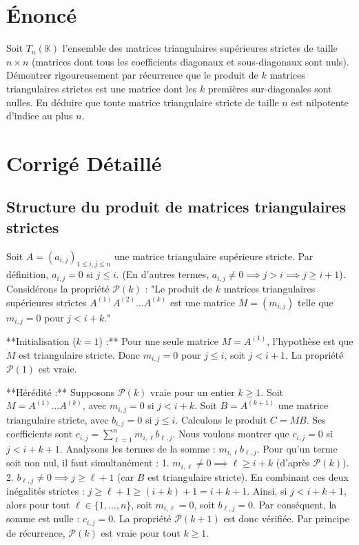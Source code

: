 \documentclass[11pt,a4paper]{article}
\begin{document}
\section{Énoncé}
Soit $T_n(\mathbb{K})$ l'ensemble des matrices triangulaires supérieures strictes de taille $n \times n$ (matrices dont tous les coefficients diagonaux et sous-diagonaux sont nuls).
Démontrer rigoureusement par récurrence que le produit de $k$ matrices triangulaires strictes est une matrice dont les $k$ premières sur-diagonales sont nulles. En déduire que toute matrice triangulaire stricte de taille $n$ est nilpotente d'indice au plus $n$.

\section{Corrigé Détaillé}

\subsection{Structure du produit de matrices triangulaires strictes}
Soit $A = (a_{i,j})_{1 \le i,j \le n}$ une matrice triangulaire supérieure stricte.
Par définition, $a_{i,j} = 0$ si $j \le i$. (En d'autres termes, $a_{i,j} \neq 0 \implies j > i \implies j \ge i+1$).
Considérons la propriété $\mathcal{P}(k)$ : "Le produit de $k$ matrices triangulaires supérieures strictes $A^{(1)} A^{(2)} \dots A^{(k)}$ est une matrice $M = (m_{i,j})$ telle que $m_{i,j} = 0$ pour $j < i + k$."

**Initialisation ($k=1$) :**
Pour une seule matrice $M = A^{(1)}$, l'hypothèse est que $M$ est triangulaire stricte. Donc $m_{i,j} = 0$ pour $j \le i$, soit $j < i + 1$. La propriété $\mathcal{P}(1)$ est vraie.

**Hérédité :**
Supposons $\mathcal{P}(k)$ vraie pour un entier $k \ge 1$.
Soit $M = A^{(1)} \dots A^{(k)}$, avec $m_{i,j} = 0$ si $j < i + k$.
Soit $B = A^{(k+1)}$ une matrice triangulaire stricte, avec $b_{i,j} = 0$ si $j \le i$.
Calculons le produit $C = M B$. Ses coefficients sont $c_{i,j} = \sum_{\ell=1}^n m_{i,\ell} b_{\ell,j}$.
Nous voulons montrer que $c_{i,j} = 0$ si $j < i + k + 1$.
Analysons les termes de la somme : $m_{i,\ell} b_{\ell,j}$.
Pour qu'un terme soit non nul, il faut simultanément :
1. $m_{i,\ell} \neq 0 \implies \ell \ge i + k$ (d'après $\mathcal{P}(k)$).
2. $b_{\ell,j} \neq 0 \implies j \ge \ell + 1$ (car $B$ est triangulaire stricte).
En combinant ces deux inégalités strictes :
$j \ge \ell + 1 \ge (i + k) + 1 = i + k + 1$.
Ainsi, si $j < i + k + 1$, alors pour tout $\ell \in \{1, \dots, n\}$, soit $m_{i,\ell} = 0$, soit $b_{\ell,j} = 0$.
Par conséquent, la somme est nulle : $c_{i,j} = 0$.
La propriété $\mathcal{P}(k+1)$ est donc vérifiée.
Par principe de récurrence, $\mathcal{P}(k)$ est vraie pour tout $k \ge 1$.
\end{document}
